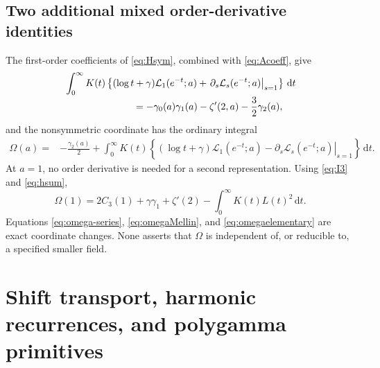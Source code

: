 \documentclass[11pt,a4paper]{article}
\numberwithin{equation}{section}
\theoremstyle{definition}\newtheorem{definition}[theorem]{Definition}
\theoremstyle{remark}\newtheorem{remark}[theorem]{Remark}
\newcommand{\LL}{\mathcal L}
\newcommand{\dd}{\,\mathrm d}
\begin{document}
\subsection{Two additional mixed order-derivative identities}
The first-order coefficients of \eqref{eq:Hsym}, combined with
\eqref{eq:Acoeff}, give
\begin{align}\label{eq:mixedMellin}
 &\int_0^\infty K(t)\left\{(\log t+\gamma)\LL_1(e^{-t};a)
       +\left.\partial_s\LL_s(e^{-t};a)\right|_{s=1}\right\}\dd t
 \notag\\[-2pt]
 &\hspace{25mm}=-\gamma_0(a)\gamma_1(a)-\zeta'(2,a)
                                      -\frac32\gamma_2(a),
\end{align}
and the nonsymmetric coordinate has the ordinary integral
\begin{align}\label{eq:omegaMellin}
 \Omega(a)={}&-\frac{\gamma_2(a)}2+
 \int_0^\infty K(t)\left\{(\log t+\gamma)\LL_1(e^{-t};a)
       -\left.\partial_s\LL_s(e^{-t};a)\right|_{s=1}\right\}\dd t.
\end{align}
At $a=1$, no order derivative is needed for a second representation.
Using \eqref{eq:I3} and \eqref{eq:hsum},
\begin{equation}\label{eq:omegaelementary}
 \boxed{\displaystyle
 \Omega(1)=2C_3(1)+\gamma\gamma_1+\zeta'(2)
                         -\int_0^\infty K(t)L(t)^2\dd t.}
\end{equation}
Equations \eqref{eq:omega-series}, \eqref{eq:omegaMellin}, and
\eqref{eq:omegaelementary} are exact coordinate changes. None asserts that
$\Omega$ is independent of, or reducible to, a specified smaller field.

\section{Shift transport, harmonic recurrences, and polygamma primitives}
\label{sec:shifts}
\end{document}
